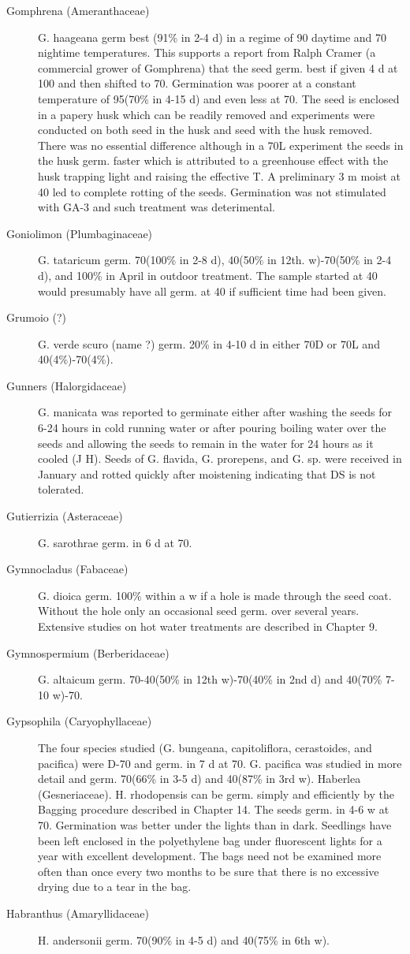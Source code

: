 \begin{description}
\item[Gom\-phrena (Ameranthaceae)] G. haa\-gea\-na germ best (91\% in 2-4 d) in a
regime of 90 daytime and 70 nightime temperatures. This supports a report from
Ralph Cramer (a commercial grower of Gom\-phrena) that the seed germ. best if given 4
d at 100 and then shifted to 70. Germination was poorer at a constant temperature of
95(70\% in 4-15 d) and even less at 70. The seed is enclosed in a papery husk which
can be readily removed and experiments were conducted on both seed in the husk
and seed with the husk removed. There was no essential difference although in a 70L
experiment the seeds in the husk germ. faster which is attributed to a greenhouse
effect with the husk trapping light and raising the effective T. A preliminary 3 m moist at
40 led to complete rotting of the seeds. Germination was not stimulated with GA-3 and
such treatment was deterimental.
\item[Goniolimon (Plumbaginaceae)] G. tataricum germ. 70(100\% in 2-8 d),
40(50\% in 12th. w)-70(50\% in 2-4 d), and 100\% in April in outdoor treatment. The
sample started at 40 would presumably have all germ. at 40 if sufficient time had been
given.
\item[Grumoio (?)] G. verde scuro (name ?) germ. 20\% in 4-10 d in either 70D or
70L and 40(4\%)-70(4\%).
\item[Gunners (Halorgidaceae)] G. manicata was reported to germinate either
after washing the seeds for 6-24 hours in cold running water or after pouring boiling
water over the seeds and allowing the seeds to remain in the water for 24 hours as it
cooled (J H). Seeds of G. flavida, G. prorepens, and G. sp. were received in January
and rotted quickly after moistening indicating that DS is not tolerated.

\item[Gutierrizia (Asteraceae)] G. sarothrae germ. in 6 d at 70.
\item[Gymnocladus (Fabaceae)] G. dioica germ. 100\% within a w if a hole is
made through the seed coat. Without the hole only an occasional seed germ. over
several years. Extensive studies on hot water treatments are described in Chapter 9.

\item[Gymnospermium (Berberidaceae)] G. altaicum germ. 70-40(50\% in 12th
w)-70(40\% in 2nd d) and 40(70\% 7-10 w)-70.
\item[Gypsophila (Caryophyllaceae)] The four species studied (G. bungeana,
capitoliflora, cerastoides, and pacifica) were D-70 and germ. in 7 d at 70. G. pacifica
was studied in more detail and germ. 70(66\% in 3-5 d) and 40(87\% in 3rd w).
Haberlea (Gesneriaceae). H. rhodopensis can be germ. simply and
efficiently by the Bagging procedure described in Chapter 14. The seeds germ. in 4-6
w at 70. Germination was better under the lights than in dark. Seedlings have been
left enclosed in the polyethylene bag under fluorescent lights for a year with excellent
development. The bags need not be examined more often than once every two
months to be sure that there is no excessive drying due to a tear in the bag.
\item[Habranthus (Amaryllidaceae)] H. andersonii germ. 70(90\% in 4-5 d) and
40(75\% in 6th w).


\end{description}
